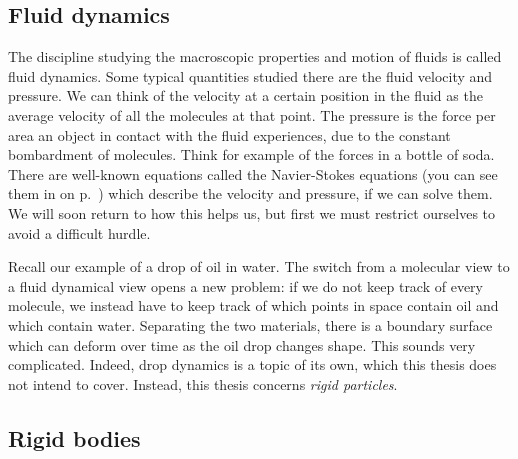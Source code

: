 \documentclass[thesis.tex]{subfiles}
\begin{document}

\subsection*{Fluid dynamics}

The discipline studying the macroscopic properties and motion of fluids is called fluid dynamics. Some typical quantities studied there are the fluid velocity and pressure. We can think of the velocity at a certain position in the fluid as the average velocity of all the molecules at that point. The pressure is the force per area an object in contact with the fluid experiences, due to the constant bombardment of molecules. Think for example of the forces in a bottle of soda. There are well-known equations called the Navier-Stokes equations (you can see them in  on p.~\pageref{eqn:navierstokes}) which describe the velocity and pressure, if we can solve them. We will soon return to how this helps us, but first we must restrict ourselves to avoid a difficult hurdle.

Recall our example of a drop of oil in water. The switch from a molecular view to a fluid dynamical view opens a new problem: if we do not keep track of every molecule, we instead have to keep track of which points in space contain oil and which contain water. Separating the two materials, there is a boundary surface which can deform over time as the oil drop changes shape. This sounds very complicated. Indeed, drop dynamics is a topic of its own, which this thesis does not intend to cover. Instead, this thesis concerns \emph{rigid particles}.

\subsection*{Rigid bodies}
\end{document}
